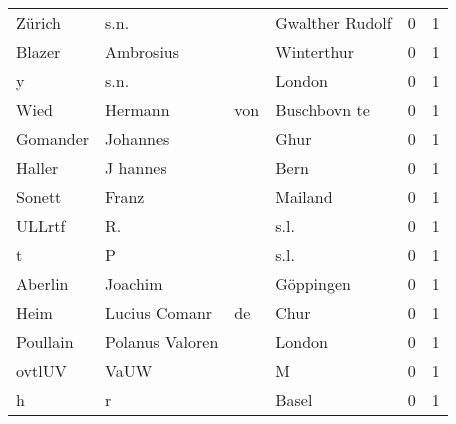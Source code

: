 \documentclass[10pt,a4paper,landscape]{article}
\begin{document}
\begin{longtable}{llllrr}
                   Zürich &                               s.n. &             &                             Gwalther Rudolf &          0 &         1 \\
                   Blazer &                          Ambrosius &             &                                  Winterthur &          0 &         1 \\
                        y &                               s.n. &             &                                      London &          0 &         1 \\
                     Wied &                            Hermann &         von &                                Buschbovn te &          0 &         1 \\
                 Gomander &                           Johannes &             &                                        Ghur &          0 &         1 \\
                   Haller &                           J hannes &             &                                        Bern &          0 &         1 \\
                   Sonett &                              Franz &             &                                     Mailand &          0 &         1 \\
                   ULLrtf &                                 R. &             &                                        s.l. &          0 &         1 \\
                        t &                                  P &             &                                        s.l. &          0 &         1 \\
                  Aberlin &                            Joachim &             &                                   Göppingen &          0 &         1 \\
                     Heim &                      Lucius Comanr &          de &                                        Chur &          0 &         1 \\
                 Poullain &                    Polanus Valoren &             &                                      London &          0 &         1 \\
                   ovtlUV &                               VaUW &             &                                           M &          0 &         1 \\
                        h &                                  r &             &                                       Basel &          0 &         1 \\

\end{longtable}
\end{document}
